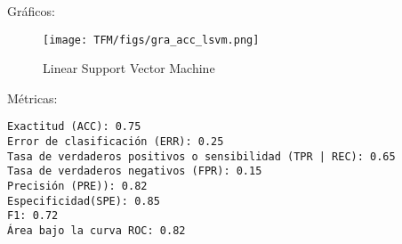 \begin{itemize}
\begin{minipage}{\linewidth}
Gráficos:
\begin{figure}[H]
\centerline{\texttt{[image: TFM/figs/gra\_acc\_lsvm.png]}}
\caption{Linear Support Vector Machine}
\label{fig:gra_acc_lsvm}
\end{figure}
Métricas:
\begin{verbatim}
Exactitud (ACC): 0.75
Error de clasificación (ERR): 0.25
Tasa de verdaderos positivos o sensibilidad (TPR | REC): 0.65
Tasa de verdaderos negativos (FPR): 0.15
Precisión (PRE)): 0.82
Especificidad(SPE): 0.85
F1: 0.72
Área bajo la curva ROC: 0.82
\end{verbatim}
\end{minipage}

\end{itemize}

